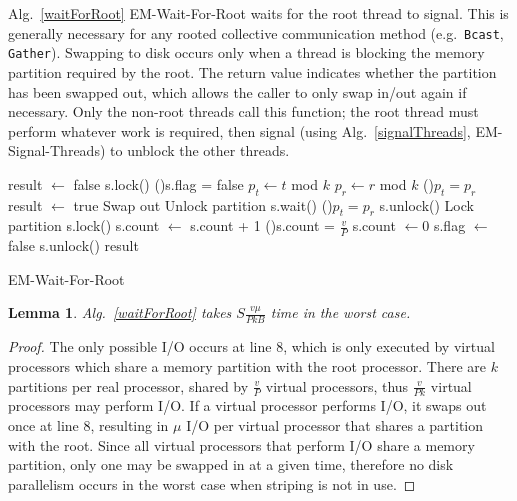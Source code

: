 \documentclass[12pt]{carletoncsthesis}
\newtheorem{lemma}[thm]{Lemma}
\begin{document}
Alg.~\ref{waitForRoot} {\sc EM-Wait-For-Root} waits for the root thread to
signal.  This is generally necessary for any rooted collective communication
method (e.g.\ {\tt Bcast}, {\tt Gather}).  Swapping to disk occurs only when
a thread is blocking the memory partition required by the root.  The return
value indicates whether the partition has been swapped out, which allows the
caller to only swap in/out again if necessary.  Only the non-root threads
call this function; the root thread must perform whatever work is required,
then signal (using Alg.~\ref{signalThreads}, {\sc EM-Signal-Threads}) to
unblock the other threads.

\begin{algorithm}[h]
	\BlankLine
	result $\longleftarrow$ false\;
	s.lock()\;
	\If(){s.flag = false}{
		$p_t \longleftarrow t$ mod $k$ \;
		$p_r \longleftarrow r$ mod $k$ \;
		\If(){$p_t = p_r$}{
			\;
			result $\longleftarrow$ true\;
			Swap out\;
			Unlock partition\;
		}
		s.wait() \;
		\If(){$p_t = p_r$}{
			\;
			s.unlock() \;
			Lock partition\;
			s.lock()\;
		}
	}
	s.count $\longleftarrow$ s.count + 1\;
	\If(){s.count = $\frac{v}{P}$}{
		\;
		s.count $\longleftarrow 0$\;
		s.flag $\longleftarrow$ false\;
	}
	s.unlock()\;
	\Return result\;
	\caption{\sc EM-Wait-For-Root}
	\label{waitForRoot}
\end{algorithm}

\begin{lemma}
\label{wait-root-io}
Alg.~\ref{waitForRoot} takes $S\frac{v\mu}{PkB}$ time in the worst case.
\end{lemma}
\begin{proof}
The only possible I/O occurs at line 8, which is only executed by virtual
processors which share a memory partition with the root processor.  There are
$k$ partitions per real processor, shared by $\frac{v}{P}$ virtual processors,
thus $\frac{v}{Pk}$ virtual processors may perform I/O.  If a virtual
processor performs I/O, it swaps out once at line 8, resulting in $\mu$ I/O per
virtual processor that shares a partition with the root.  Since all virtual
processors that perform I/O share a memory partition, only one may be swapped
in at a given time, therefore no disk parallelism occurs in the worst case
when striping is not in use.
\end{proof}
\end{document}
